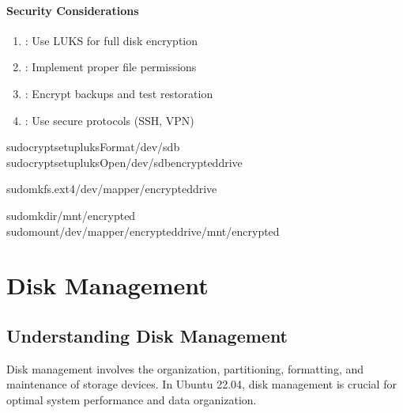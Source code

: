 \documentclass[letterpaper,10pt,english]{sphinxmanual}
\begin{document}
\subsubsection{Security Considerations}
\label{\detokenize{storage-overview:security-considerations}}\begin{enumerate}
%
\item {} 
\sphinxAtStartPar
{}: Use LUKS for full disk encryption

\item {} 
\sphinxAtStartPar
{}: Implement proper file permissions

\item {} 
\sphinxAtStartPar
{}: Encrypt backups and test restoration

\item {} 
\sphinxAtStartPar
{}: Use secure protocols (SSH, VPN)

\end{enumerate}

\begin{sphinxVerbatim}[commandchars=\\\{\}]
sudocryptsetupluksFormat/dev/sdb
sudocryptsetupluksOpen/dev/sdbencrypted\PYGZus{}drive

sudomkfs.ext4/dev/mapper/encrypted\PYGZus{}drive

sudomkdir/mnt/encrypted
sudomount/dev/mapper/encrypted\PYGZus{}drive/mnt/encrypted
\end{sphinxVerbatim}

\sphinxstepscope


\chapter{Disk Management}
\label{\detokenize{disk-management:disk-management}}\label{\detokenize{disk-management::doc}}

\section{Understanding Disk Management}
\label{\detokenize{disk-management:understanding-disk-management}}
\sphinxAtStartPar
Disk management involves the organization, partitioning, formatting, and maintenance of storage devices. In Ubuntu 22.04, disk management is crucial for optimal system performance and data organization.
\end{document}
